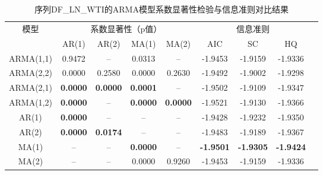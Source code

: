 \documentclass[12pt,a4paper]{ctexart}
\begin{document}
\begin{table}[H]
\centering
\caption{序列DF\_LN\_WTI的ARMA模型系数显著性检验与信息准则对比结果}
\label{tab:arma_combined}
\setlength{\tabcolsep}{4pt}  %
\begin{tabular}{cccccc ccc}
\toprule[1.2pt]
\multirow{2}{*}{模型} & \multicolumn{4}{c}{系数显著性（p值）} & \multicolumn{3}{c}{信息准则} \\
\cmidrule(lr){2-5} \cmidrule(lr){6-8}
& AR(1) & AR(2) & MA(1) & MA(2) & AIC & SC & HQ \\
\midrule[0.75pt]
ARMA(1,1)  & 0.9472 & --    & 0.0313 & --    & -1.9453 & -1.9159 & -1.9336 \\
ARMA(2,2)  & 0.0000 & 0.2580 & 0.0000 & 0.2630 & -1.9492 & -1.9002 & -1.9298 \\
ARMA(2,1)  & \textbf{0.0000} & \textbf{0.0000} & \textbf{0.0001} & --    & -1.9502 & -1.9109 & -1.9347 \\
ARMA(1,2)  & \textbf{0.0000} & --    & \textbf{0.0000} & \textbf{0.0000} & -1.9521 & -1.9130 & -1.9366 \\
AR(1)      & \textbf{0.0000} & --    & --    & --    & -1.9428 & -1.9232 & -1.9350 \\
AR(2)      & \textbf{0.0000} & \textbf{0.0174} & --    & --    & -1.9483 & -1.9189 & -1.9367 \\
MA(1)      & --    & --    & \textbf{0.0000} & --    & \textbf{-1.9501} & \textbf{-1.9305} & \textbf{-1.9424} \\
MA(2)      & --    & --    & 0.0000 & 0.9260 & -1.9453 & -1.9159 & -1.9336 \\
\bottomrule[1.2pt]
\end{tabular}
\end{table}
\end{document}
